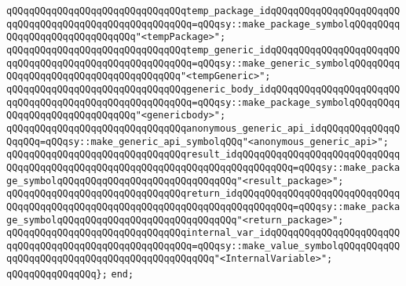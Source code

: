 \verb|qQQqqQQqqQQqqQQqqQQqqQQqqQQqqQQqtemp_package_idqQQqqQQqqQQqqQQqqQQqqQQqqQQqqQQqqQQqqQQqqQQqqQQqqQQqqQQq=qQQqsy::make_package_symbolqQQqqQQqqQQqqQQqqQQqqQQqqQQqqQQq"<tempPackage>";|\newline
\verb|qQQqqQQqqQQqqQQqqQQqqQQqqQQqqQQqtemp_generic_idqQQqqQQqqQQqqQQqqQQqqQQqqQQqqQQqqQQqqQQqqQQqqQQqqQQqqQQq=qQQqsy::make_generic_symbolqQQqqQQqqQQqqQQqqQQqqQQqqQQqqQQqqQQqqQQq"<tempGeneric>";|\newline
\verb|qQQqqQQqqQQqqQQqqQQqqQQqqQQqqQQqgeneric_body_idqQQqqQQqqQQqqQQqqQQqqQQqqQQqqQQqqQQqqQQqqQQqqQQqqQQqqQQq=qQQqsy::make_package_symbolqQQqqQQqqQQqqQQqqQQqqQQqqQQqqQQq"<genericbody>";|\newline
\verb|qQQqqQQqqQQqqQQqqQQqqQQqqQQqqQQqanonymous_generic_api_idqQQqqQQqqQQqqQQqqQQq=qQQqsy::make_generic_api_symbolqQQq"<anonymous_generic_api>";|\newline
\verb|qQQqqQQqqQQqqQQqqQQqqQQqqQQqqQQqresult_idqQQqqQQqqQQqqQQqqQQqqQQqqQQqqQQqqQQqqQQqqQQqqQQqqQQqqQQqqQQqqQQqqQQqqQQqqQQqqQQq=qQQqsy::make_package_symbolqQQqqQQqqQQqqQQqqQQqqQQqqQQqqQQq"<result_package>";|\newline
\verb|qQQqqQQqqQQqqQQqqQQqqQQqqQQqqQQqreturn_idqQQqqQQqqQQqqQQqqQQqqQQqqQQqqQQqqQQqqQQqqQQqqQQqqQQqqQQqqQQqqQQqqQQqqQQqqQQqqQQq=qQQqsy::make_package_symbolqQQqqQQqqQQqqQQqqQQqqQQqqQQqqQQq"<return_package>";|\newline
\verb|qQQqqQQqqQQqqQQqqQQqqQQqqQQqqQQqinternal_var_idqQQqqQQqqQQqqQQqqQQqqQQqqQQqqQQqqQQqqQQqqQQqqQQqqQQqqQQq=qQQqsy::make_value_symbolqQQqqQQqqQQqqQQqqQQqqQQqqQQqqQQqqQQqqQQqqQQqqQQq"<InternalVariable>";|\newline
\verb|qQQqqQQqqQQqqQQq};|\newline
\verb|end;|\newline

